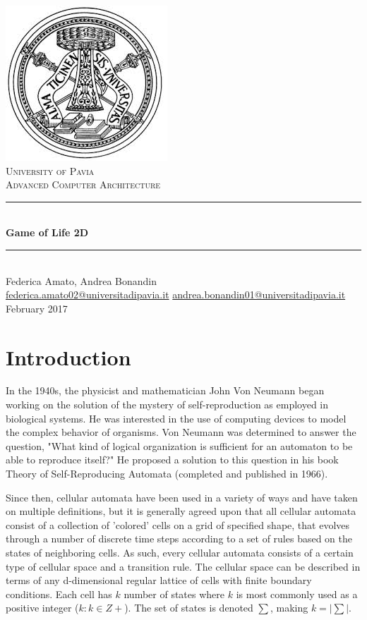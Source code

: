 \documentclass[a4paper,11pt,twoside]{report}
\begin{document}
\begin{titlepage}
	\centering
	\includegraphics[scale = 0.4]{logo.jpeg}\\[1.0 cm]
	\textsc{\LARGE University of Pavia}\\[1.0 cm]
	\textsc{\Large Advanced Computer Architecture}\\[0.5 cm]
	\rule{\linewidth}{0.2 mm} \\[0.4 cm]
	{\huge{\textbf{Game of Life 2D}}}\\
	\rule{\linewidth}{0.2 mm} \\[1 cm]

	{\large Federica Amato, Andrea Bonandin} \\[0.2 cm]
	\url{federica.amato02@universitadipavia.it}
	\url{andrea.bonandin01@universitadipavia.it} \\[0.2 cm]
	{February 2017}
\end{titlepage}

\tableofcontents

\chapter{Introduction}
In the 1940s, the physicist and mathematician John Von Neumann began working
on the solution of the mystery of self-reproduction as employed in biological systems. He was
interested in the use of computing devices to model the complex behavior of organisms.
Von Neumann was determined to answer the question, "What kind of logical organization is sufficient for an automaton to be able to reproduce itself?" He proposed a solution to this question in
his book Theory of Self-Reproducing Automata (completed and published in 1966).

\noindent Since then, cellular automata have been used in a variety of ways and have taken on multiple definitions, but it is generally agreed upon that all cellular automata consist of a collection of 'colored' cells on a grid of specified shape, that evolves through a number of discrete time steps according to a set of rules based on the states of neighboring cells. As such, every cellular automata consists of a certain type of cellular space and a transition rule. The cellular space can
be described in terms of any d-dimensional regular lattice of cells with finite boundary conditions.
Each cell has $k$ number of states where $k$ is most commonly used as a positive integer ($k : k \in Z+$). The set of states is denoted $\sum$, making $k = |\sum|$.
\end{document}

